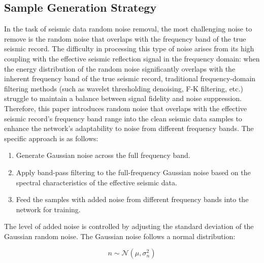 \documentclass[preprint,12pt]{elsarticle}
\begin{document}

\subsection{Sample Generation Strategy}
In the task of seismic data random noise removal, the most challenging noise to remove is the random noise that overlaps with the frequency band of the true seismic record. The difficulty in processing this type of noise arises from its high coupling with the effective seismic reflection signal in the frequency domain: when the energy distribution of the random noise significantly overlaps with the inherent frequency band of the true seismic record, traditional frequency-domain filtering methods (such as wavelet thresholding denoising, F-K filtering, etc.) struggle to maintain a balance between signal fidelity and noise suppression. Therefore, this paper introduces random noise that overlaps with the effective seismic record's frequency band range into the clean seismic data samples to enhance the network's adaptability to noise from different frequency bands. The specific approach is as follows:
\begin{enumerate}
    \item Generate Gaussian noise across the full frequency band.
    \item Apply band-pass filtering to the full-frequency Gaussian noise based on the spectral characteristics of the effective seismic data.
    \item Feed the samples with added noise from different frequency bands into the network for training.
\end{enumerate}

The level of added noise is controlled by adjusting the standard deviation of the Gaussian random noise. The Gaussian noise follows a normal distribution:

\begin{equation}
n \sim \mathcal{N}(\mu, \sigma_{n}^{2})
\end{equation}
\end{document}
